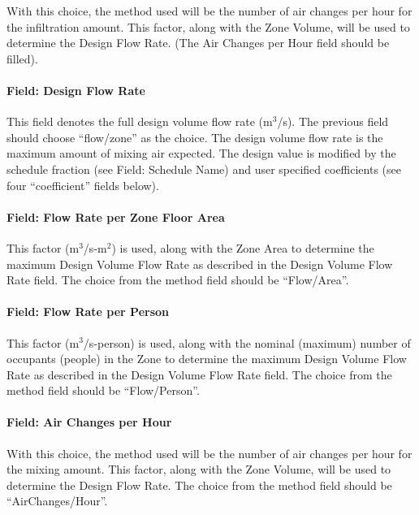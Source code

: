 With this choice, the method used will be the number of air changes per hour for the infiltration amount. This factor, along with the Zone Volume, will be used to determine the Design Flow Rate. (The Air Changes per Hour field should be filled).

\paragraph{Field: Design Flow Rate}\label{field-design-flow-rate-2}

This field denotes the full design volume flow rate (m\(^{3}\)/s). The previous field should choose ``flow/zone'' as the choice. The design volume flow rate is the maximum amount of mixing air expected. The design value is modified by the schedule fraction (see Field: Schedule Name) and user specified coefficients (see four ``coefficient'' fields below).

\paragraph{Field: Flow Rate per Zone Floor Area}\label{field-flow-rate-per-zone-floor-area-1}

This factor (m\(^{3}\)/s-m\(^{2}\)) is used, along with the Zone Area to determine the maximum Design Volume Flow Rate as described in the Design Volume Flow Rate field. The choice from the method field should be ``Flow/Area''.

\paragraph{Field: Flow Rate per Person}\label{field-flow-rate-per-person-1}

This factor (m\(^{3}\)/s-person) is used, along with the nominal (maximum) number of occupants (people) in the Zone to determine the maximum Design Volume Flow Rate as described in the Design Volume Flow Rate field. The choice from the method field should be ``Flow/Person''.

\paragraph{Field: Air Changes per Hour}\label{field-air-changes-per-hour-2}

With this choice, the method used will be the number of air changes per hour for the mixing amount. This factor, along with the Zone Volume, will be used to determine the Design Flow Rate. The choice from the method field should be ``AirChanges/Hour''.

